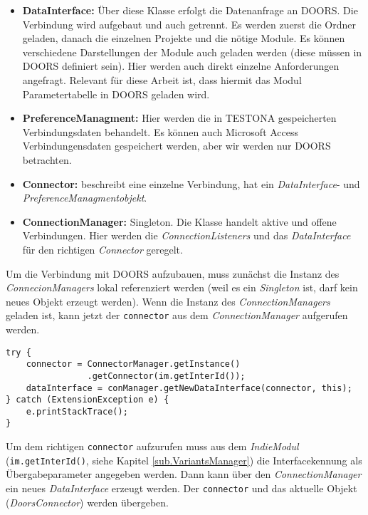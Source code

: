 \begin{itemize}
\item \textbf{DataInterface: }Über diese Klasse erfolgt die Datenanfrage an DOORS. Die Verbindung wird aufgebaut und auch getrennt. Es werden zuerst die Ordner geladen, danach die einzelnen Projekte und die nötige Module. Es können verschiedene Darstellungen der Module auch geladen werden (diese müssen in DOORS definiert sein). Hier werden auch direkt einzelne Anforderungen angefragt. Relevant für diese Arbeit ist, dass hiermit das Modul Parametertabelle in DOORS geladen wird.

\item \textbf{PreferenceManagment: } Hier werden die in TESTONA gespeicherten Verbindungsdaten behandelt. Es können auch Microsoft Access Verbindungensdaten gespeichert werden, aber wir werden nur DOORS betrachten.

\item \textbf{Connector: }beschreibt eine einzelne Verbindung, hat ein \textit{DataInterface}- und \textit{PreferenceManagmentobjekt}.

\item \textbf{ConnectionManager: }Singleton. Die Klasse handelt aktive und offene Verbindungen. Hier werden die \textit{ConnectionListeners} und das \textit{DataInterface} für den richtigen \textit{Connector} geregelt.

\end{itemize}


Um die Verbindung mit DOORS aufzubauen, muss zunächst die Instanz des \textit{ConnecionManagers} lokal referenziert werden (weil es ein \textit{Singleton} ist, darf kein neues Objekt erzeugt werden). Wenn die Instanz des \textit{ConnectionManagers} geladen ist, kann jetzt der \texttt{connector} aus dem \textit{ConnectionManager} aufgerufen werden.

\begin{lstlisting}[caption={Verbindungsaufbau}, captionpos=b]
try {
	connector = ConnectorManager.getInstance()
				.getConnector(im.getInterId());
	dataInterface = conManager.getNewDataInterface(connector, this);
} catch (ExtensionException e) {
	e.printStackTrace();
}
\end{lstlisting}

 Um dem richtigen \texttt{connector} aufzurufen muss aus dem \textit{IndieModul} (\texttt{im.getInterId()}, siehe Kapitel \ref{sub.VariantsManager}) die Interfacekennung als Übergabeparameter angegeben werden. Dann kann über den \textit{ConnectionManager} ein neues \textit{DataInterface} erzeugt werden. Der \texttt{connector} und das aktuelle Objekt (\textit{DoorsConnector}) werden übergeben.\\
 
